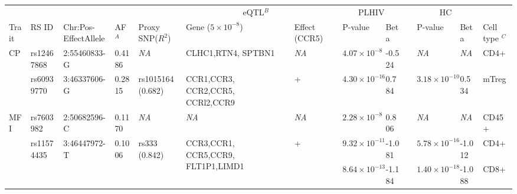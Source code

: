 \documentclass{book}
\begin{document}
\begin{refsection}
\begin{landscape}
\begin{table}
  \tiny
  \renewcommand{\arraystretch}{1.5}
  \begin{tabular}{m{0.4cm}m{1cm}m{1.5cm}p{0.5cm}p{1cm}p{1.3cm}p{0.4cm}p{0cm}p{1.3cm}p{0.7cm}p{0cm}p{1.3cm}p{0.7cm}p{1.6cm}}
                          &                              &                                &                          &                                     & \multicolumn{2}{c}{eQTL$^B$}                                                && \multicolumn{2}{c}{PLHIV}       && \multicolumn{2}{c}{HC}               & \\
    \cline{6-7} \cline{9-10} \cline{12-13}
    Trait                 & RS ID                        & Chr:Pos-EffectAllele           & AF$^A$                   & Proxy SNP($R^2$)                    & Gene ($5\times 10^{-8}$)                               & Effect (CCR5)       && P-value                & Beta   && P-value                & Beta        & Cell type $^C$ \\
    \hline
    \multirow{2}{*}{CP}   & rs12467868                   & 2:55460833-G                   & 0.4186                   & \textit{NA}                         & CLHC1,RTN4, SPTBN1                                     & \textit{NA}         && $4.07 \times 10^{-8}$  & -0.524 && \textit{NA}            & \textit{NA} & CD4+  \\
    \cline{2-14}
                          & rs60939770                   & 3:46337606-G                   & 0.2815                   & rs1015164 (0.682)                   & CCR1,CCR3, CCR2,CCR5, CCRl2,CCR9                       & +                   && $4.30 \times 10^{-16}$ & 0.784  && $3.18 \times 10^{-10}$ & 0.534       & mTreg \\
    \hline
    \multirow{12}{*}{MFI} & rs7603982                    & 2:50682596-C                   & 0.1170                   & \textit{NA}                         & \textit{NA}                                            & \textit{NA}         && $2.28 \times 10^{-8}$  & 0.806  && \textit{NA}            & \textit{NA} & CD45+  \\
    \cline{2-14}
                          & \multirow{10}{*}{rs11574435} & \multirow{10}{*}{3:46447972-T} & \multirow{10}{*}{0.1006} & \multirow{10}{1.1cm}{rs333 (0.842)} & \multirow{10}{2cm}{CCR3,CCR1, CCR5,CCR9, FLT1P1,LIMD1} & \multirow{10}{*}{+} && $9.32 \times 10^{-11}$ & -1.081 && $5.78 \times 10^{-16}$ & -1.012      & CD4+  \\
    \cline{9-14}
                          &                              &                                &                          &                                     &                                                        &                     && $8.64 \times 10^{-13}$ & -1.184 && $1.40 \times 10^{-18}$ & -1.088      & CD8+        \\

\end{tabular}
\end{table}
\end{landscape}
\end{refsection}
\end{document}
